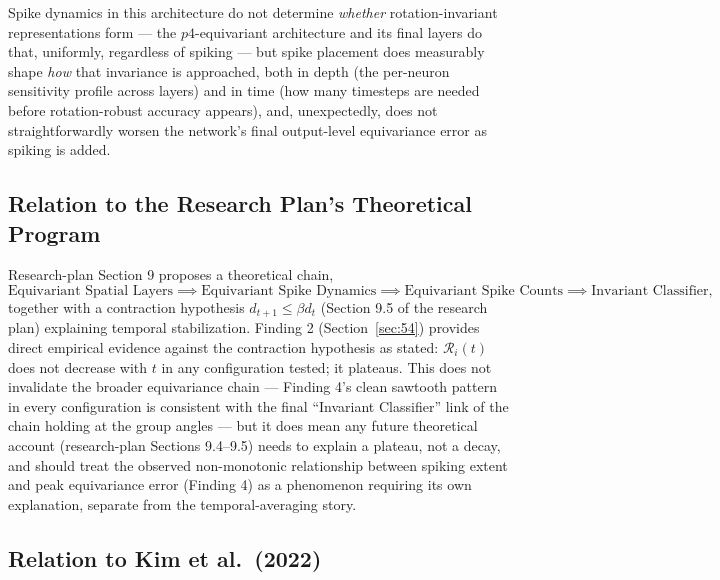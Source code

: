 \documentclass[11pt]{article}
\begin{document}
\begin{keypoint}
Spike dynamics in this architecture do not determine \emph{whether} rotation-invariant
representations form --- the $p4$-equivariant architecture and its final layers do that, uniformly,
regardless of spiking --- but spike placement does measurably shape \emph{how} that invariance is
approached, both in depth (the per-neuron sensitivity profile across layers) and in time (how many
timesteps are needed before rotation-robust accuracy appears), and, unexpectedly, does not
straightforwardly worsen the network's final output-level equivariance error as spiking is added.
\end{keypoint}

\subsection{Relation to the Research Plan's Theoretical Program}

Research-plan Section 9 proposes a theoretical chain,
\[
\text{Equivariant Spatial Layers} \implies \text{Equivariant Spike Dynamics} \implies
\text{Equivariant Spike Counts} \implies \text{Invariant Classifier},
\]
together with a contraction hypothesis $d_{t+1} \leq \beta d_t$ (Section 9.5 of the research plan)
explaining temporal stabilization. Finding 2 (Section~\ref{sec:54}) provides direct empirical evidence
against the contraction hypothesis as stated: $\mathcal{R}_i(t)$ does not decrease with $t$ in any
configuration tested; it plateaus. This does not invalidate the broader equivariance chain ---
Finding 4's clean sawtooth pattern in every configuration is consistent with the final ``Invariant
Classifier'' link of the chain holding at the group angles --- but it does mean any future
theoretical account (research-plan Sections 9.4--9.5) needs to explain a plateau, not a decay, and
should treat the observed non-monotonic relationship between spiking extent and peak equivariance
error (Finding 4) as a phenomenon requiring its own explanation, separate from the temporal-averaging
story.

\subsection{Relation to Kim et al.\ (2022)}
\end{document}
